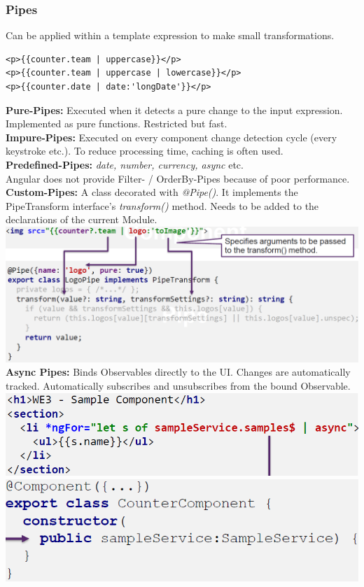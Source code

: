 \subsubsection{Pipes}
Can be applied within a template expression to make small transformations.
\begin{lstlisting}
<p>{{counter.team | uppercase}}</p>
<p>{{counter.team | uppercase | lowercase}}</p>
<p>{{counter.date | date:'longDate'}}</p>
\end{lstlisting}
\textbf{Pure-Pipes:} Executed when it detects a pure change to the input expression.
Implemented as pure functions. Restricted but fast.\\
\textbf{Impure-Pipes:} Executed on every component change detection cycle (every keystroke etc.).
To reduce processing time, caching is often used.\\
\textbf{Predefined-Pipes:} \textit{date, number, currency, async} etc.\\
Angular does not provide Filter- / OrderBy-Pipes because of poor performance.\\
\textbf{Custom-Pipes:} A class decorated with \textit{@Pipe()}.
It implements the PipeTransform interface's \textit{transform()} method.
Needs to be added to the declarations of the current Module.
\includegraphics[width=\linewidth]{img/angular_pipes.png}
\textbf{Async Pipes:} Binds Observables directly to the UI.
Changes are automatically tracked.
Automatically subscribes and unsubscribes from the bound Observable.\\
\includegraphics[width=0.6\linewidth]{img/angular_async_pipes.png}
\includegraphics[width=0.4\linewidth]{img/angular_async_pipes2.png}

